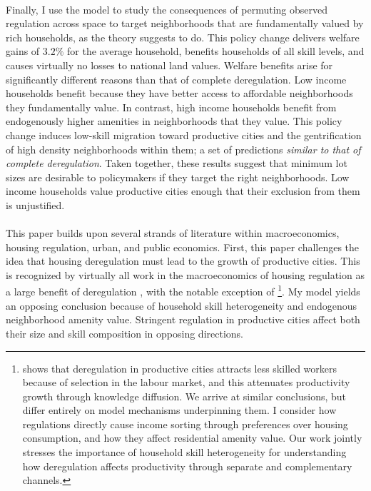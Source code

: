 \documentclass[12pt]{article}
\begin{document}
	\paragraph*{}
	 Finally, I use the model to study the consequences of permuting observed regulation across space to target neighborhoods that are fundamentally valued by rich households, as the theory suggests to do. This policy change delivers welfare gains of $3.2\%$ for the average household, benefits households of all skill levels, and causes virtually no losses to national land values. Welfare benefits arise for significantly different reasons than that of complete deregulation. Low income households benefit because they have better access to affordable neighborhoods they fundamentally value. In contrast, high income households benefit from endogenously higher amenities in neighborhoods that they value. This policy change induces low-skill migration toward productive cities and the gentrification of high density neighborhoods within them; a set of predictions \textit{similar to that of complete deregulation}. Taken together, these results suggest that minimum lot sizes are desirable to policymakers if they target the right neighborhoods. Low income households value productive cities enough that their exclusion from them is unjustified. 
	
	\paragraph*{}
	This paper builds upon several strands of literature within  macroeconomics, housing regulation, urban, and public economics. First, this paper challenges the idea that housing deregulation must lead to the growth of productive cities. This is recognized by virtually all work in the macroeconomics of housing regulation as a large benefit of deregulation \citep{hseihmoretti, durantonpugaurbgrowth, parkho, hop, bunten}, with the notable exception of \cite{Martellini}\footnote{\cite{Martellini} shows that deregulation in productive cities attracts less skilled workers because of selection in the labour market, and this attenuates productivity growth through knowledge diffusion. We arrive at similar conclusions, but differ entirely on model mechanisms underpinning them. I consider how regulations directly cause income sorting through preferences over housing consumption, and how they affect residential amenity value. Our work jointly stresses the importance of household skill heterogeneity for understanding how deregulation affects productivity through separate and complementary channels.}. My model yields an opposing conclusion because of household skill heterogeneity and endogenous neighborhood amenity value. Stringent regulation in productive cities affect both their size and skill composition in opposing directions. 
	
\end{document}
